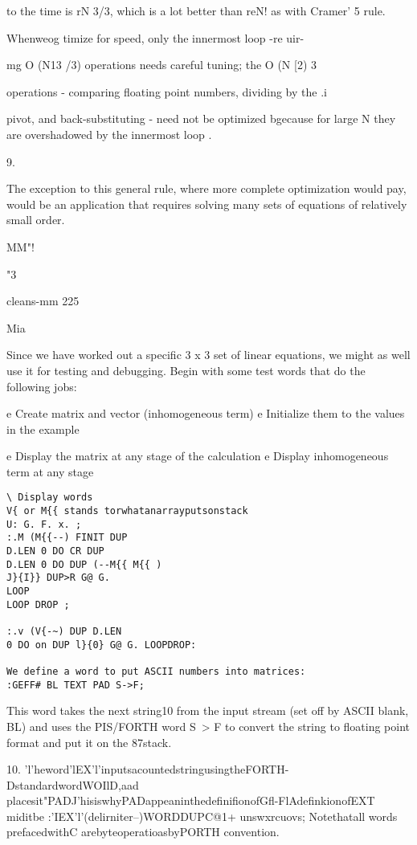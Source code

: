 to the time is rN 3/3, which is a lot better than reN! as with
Cramer' 5 rule.

Whenweog timize for speed, only the innermost loop -re uir-

mg O (N13 /3) operations needs careful tuning; the O (N [2) 3

operations - comparing floating point numbers, dividing by the .i

pivot, and back-substituting - need not be optimized bgecause for
large N they are overshadowed by the innermost loop .

 

9.

The exception to this general rule, where more complete optimization would pay, would be an
application that requires solving many sets of equations of relatively small order.

 

MM"!

"3

cleans-mm 225

Mia

Since we have worked out a specific 3 x 3 set of linear equations,
we might as well use it for testing and debugging. Begin with
some test words that do the following jobs:

e Create matrix and vector (inhomogeneous term)
e Initialize them to the values in the example

e Display the matrix at any stage of the calculation
e Display inhomogeneous term at any stage
\begin{verbatim}
\ Display words
V{ or M{{ stands torwhatanarrayputsonstack
U: G. F. x. ;
:.M (M{{--) FINIT DUP
D.LEN 0 DO CR DUP
D.LEN 0 DO DUP (--M{{ M{{ )
J}{I}} DUP>R G@ G.
LOOP
LOOP DROP ;

:.v (V{-~) DUP D.LEN
0 DO on DUP l}{0} G@ G. LOOPDROP:

We define a word to put ASCII numbers into matrices:
:GEFF# BL TEXT PAD S->F;
\end{verbatim}

This word takes the next string10 from the input stream (set off
by ASCII blank, BL) and uses the PIS/FORTH word S~> F to
convert the string to floating point format and put it on the
87stack.

 

10. 'l'heword'lEX'l'inputsacountedstringusingtheFORTH-DstandardwordWOIlD,aad
placesit"PADJ'hisiswhyPADappeaninthedefinifionofGfl-FlAdefinkionofEXT
miditbe :'IEX'l'(delirniter--)WORDDUPC@1+ unswxrcuovs; Notethatall
words prefacedwithC arebyteoperatioasbyPORTH convention.

